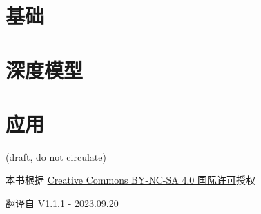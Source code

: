 \documentclass[oneside,11pt]{memoir}
\begin{document}




\part{基础}






\part{深度模型}





\part{应用}











\printindex


\newpage


\ifdefined\draft
\begin{center}
  {\color{red} (draft, do not circulate)}
\end{center}
\else
本书根据
\href{https://creativecommons.org/licenses/by-nc-sa/4.0/}{Creative
  Commons BY-NC-SA 4.0 国际许可}授权
\fi

\begin{center}
    翻译自 \href{https://fleuret.org/public/lbdl.pdf}{V1.1.1} - 2023.09.20
\end{center}



\checknbdrafts
\end{document}
